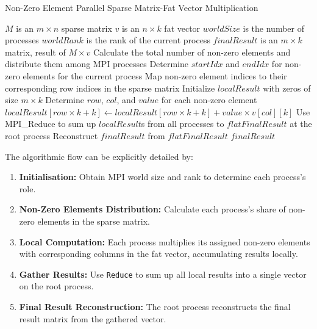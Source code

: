 \documentclass[12pt,oneside]{book} %
\begin{document}
\begin{algorithm}
    \caption{Non-Zero Element Parallel Sparse Matrix-Fat Vector Multiplication}
    \begin{algorithmic}
        \Require $M$ is an $m \times n$ sparse matrix
        \Require $v$ is an $n \times k$ fat vector
        \Require $worldSize$ is the number of processes
        \Require $worldRank$ is the rank of the current process
        \Ensure  $finalResult$ is an $m \times k$ matrix, result of $M \times v$
        \State Calculate the total number of non-zero elements and distribute them among MPI processes
        \State Determine $startIdx$ and $endIdx$ for non-zero elements for the current process
        \State Map non-zero element indices to their corresponding row indices in the sparse matrix
        \State Initialize $localResult$ with zeros of size $m \times k$
        \State Determine $row$, $col$, and $value$ for each non-zero element
        \State $localResult[row \times k + k] \gets localResult[row \times k + k] + value \times v[col][k]$
        \EndFor
        \EndFor
        \State Use MPI\_Reduce to sum up $localResult$s from all processes to $flatFinalResult$ at the root process
        \State Reconstruct $finalResult$ from $flatFinalResult$
        \State \Return $finalResult$
        \EndIf
    \end{algorithmic}
\end{algorithm}

The algorithmic flow can be explicitly detailed by:
\begin{enumerate}
    \item \textbf{Initialisation:} Obtain MPI world size and rank to determine each process's role.
    \item \textbf{Non-Zero Elements Distribution:} Calculate each process's share of non-zero elements in the sparse matrix.
    \item \textbf{Local Computation:} Each process multiplies its assigned non-zero elements with corresponding columns in the fat vector, accumulating results locally.
    \item \textbf{Gather Results:} Use \texttt{Reduce} to sum up all local results into a single vector on the root process.
    \item \textbf{Final Result Reconstruction:} The root process reconstructs the final result matrix from the gathered vector.
\end{enumerate}
\end{document}
